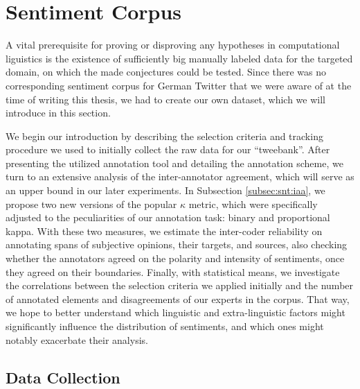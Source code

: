 

\section{Sentiment Corpus}\label{sec:snt:corpus}

A vital prerequisite for proving or disproving any hypotheses in
computational liguistics is the existence of sufficiently big manually
labeled data for the targeted domain, on which the made conjectures
could be tested.  Since there was no corresponding sentiment corpus
for German Twitter that we were aware of at the time of writing this
thesis, we had to create our own dataset, which we will introduce in
this section.

We begin our introduction by describing the selection criteria and
tracking procedure we used to initially collect the raw data for our
``tweebank''.  After presenting the utilized annotation tool and
detailing the annotation scheme, we turn to an extensive analysis of
the inter-annotator agreement, which will serve as an upper bound in
our later experiments.  In Subsection \ref{subsec:snt:iaa}, we propose
two new versions of the popular $\kappa$ metric, which were
specifically adjusted to the peculiarities of our annotation task:
binary and proportional kappa.  With these two measures, we estimate
the inter-coder reliability on annotating spans of subjective
opinions, their targets, and sources, also checking whether the
annotators agreed on the polarity and intensity of sentiments, once
they agreed on their boundaries.  Finally, with statistical means, we
investigate the correlations between the selection criteria we applied
initially and the number of annotated elements and disagreements of
our experts in the corpus.  That way, we hope to better understand
which linguistic and extra-linguistic factors might significantly
influence the distribution of sentiments, and which ones might notably
exacerbate their analysis.

\subsection{Data Collection}

